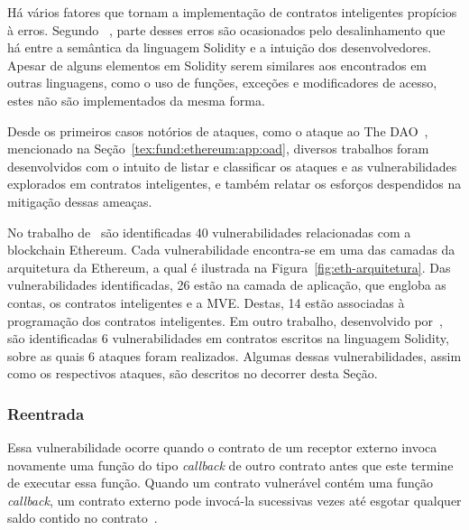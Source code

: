 Há vários fatores que tornam a implementação de contratos inteligentes propícios à erros. Segundo ~\cite{atzei2017survey-attacks-sok}, parte desses erros são ocasionados pelo desalinhamento que há entre a semântica da linguagem Solidity e a intuição dos desenvolvedores. Apesar de alguns elementos em Solidity serem similares aos encontrados em outras linguagens, como o uso de funções, exceções e modificadores de acesso, estes não são implementados da mesma forma.

Desde os primeiros casos notórios de ataques, como o ataque ao The DAO~\cite{siegel-dao-attack}, mencionado na Seção~\ref{tex:fund:ethereum:app:oad}, diversos trabalhos foram desenvolvidos com o intuito de listar e classificar os ataques e as vulnerabilidades explorados em contratos inteligentes, e também relatar os esforços despendidos na mitigação dessas ameaças. 

No trabalho de~ são identificadas 40 vulnerabilidades relacionadas com a blockchain Ethereum. Cada vulnerabilidade encontra-se em uma das camadas da arquitetura da Ethereum, a qual é ilustrada na Figura~\ref{fig:eth-arquitetura}. Das vulnerabilidades identificadas, 26 estão na camada de aplicação, que engloba as contas, os contratos inteligentes e a MVE. Destas, 14 estão associadas à programação dos contratos inteligentes. Em outro trabalho, desenvolvido por~, são identificadas 6 vulnerabilidades em contratos escritos na linguagem Solidity, sobre as quais 6 ataques foram realizados. Algumas dessas vulnerabilidades, assim como os respectivos ataques, são descritos no decorrer desta Seção.

\subsubsection*{\textbf{Reentrada}}

Essa vulnerabilidade ocorre quando o contrato de um receptor externo invoca novamente uma função do tipo \textit{callback} de outro contrato antes que este termine de executar essa função. Quando um contrato vulnerável contém uma função \textit{callback}, um contrato externo pode invocá-la sucessivas vezes até esgotar qualquer saldo contido no contrato~\cite{chen2020survey-ethereum-acm, sayeed2020smart-attacks-ieee}. 

